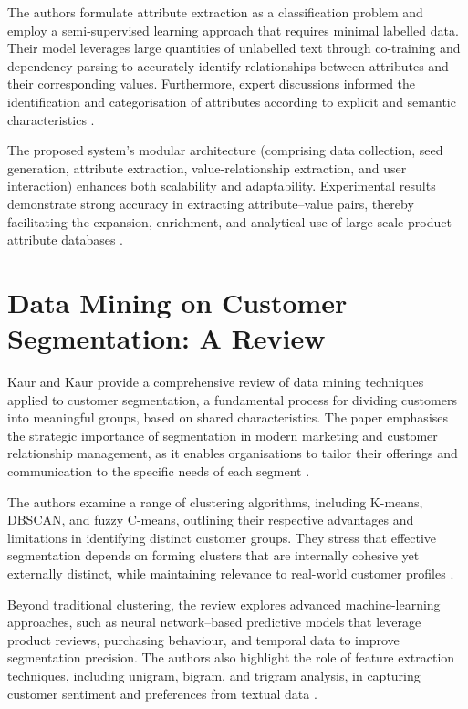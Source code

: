 \documentclass[a4paper, 12pt, twoside]{report}  %
\begin{document}
\indent The authors formulate attribute extraction as a classification problem and employ a semi-supervised learning approach that requires minimal labelled data. Their model leverages large quantities of unlabelled text through co-training and dependency parsing to accurately identify relationships between attributes and their corresponding values. Furthermore, expert discussions informed the identification and categorisation of attributes according to explicit and semantic characteristics \cite{ghani}.

\indent The proposed system’s modular architecture (comprising data collection, seed generation, attribute extraction, value-relationship extraction, and user interaction) enhances both scalability and adaptability. Experimental results demonstrate strong accuracy in extracting attribute–value pairs, thereby facilitating the expansion, enrichment, and analytical use of large-scale product attribute databases \cite{ghani}.

\section{Data Mining on Customer Segmentation: A Review}

\indent Kaur and Kaur provide a comprehensive review of data mining techniques applied to customer segmentation, a fundamental process for dividing customers into meaningful groups, based on shared characteristics. The paper emphasises the strategic importance of segmentation in modern marketing and customer relationship management, as it enables organisations to tailor their offerings and communication to the specific needs of each segment \cite{datamining}.

\indent The authors examine a range of clustering algorithms, including K-means, DBSCAN, and fuzzy C-means, outlining their respective advantages and limitations in identifying distinct customer groups. They stress that effective segmentation depends on forming clusters that are internally cohesive yet externally distinct, while maintaining relevance to real-world customer profiles \cite{datamining}.

\indent Beyond traditional clustering, the review explores advanced machine-learning approaches, such as neural network–based predictive models that leverage product reviews, purchasing behaviour, and temporal data to improve segmentation precision. The authors also highlight the role of feature extraction techniques, including unigram, bigram, and trigram analysis, in capturing customer sentiment and preferences from textual data \cite{datamining}.
\end{document}
